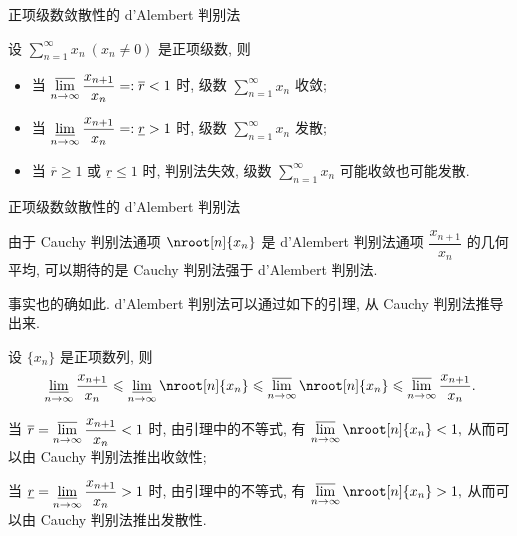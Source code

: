 \begin{frame}{正项级数敛散性的 d'Alembert 判别法}

\begin{thm}
设 $\sum\limits_{n=1}^\infty x_n ~ (x_n \neq 0)$ 是正项级数, 则
\begin{itemize}
\item[(1).] 当 $\varlimsup\limits_{n\to\infty} \dfrac{x_{n+1}}{x_n} =: \overline{r} < 1$ 时, 级数 $\sum\limits_{n=1}^\infty x_n$ 收敛;
\item[(2).] 当 $\varliminf\limits_{n\to\infty} \dfrac{x_{n+1}}{x_n} =: \underline{r} > 1$ 时, 级数 $\sum\limits_{n=1}^\infty x_n$ 发散;
\item[(3).] 当 $\overline{r} \geqslant 1$ 或 $\underline{r} \leqslant 1$ 时, 判别法失效, 级数 $\sum\limits_{n=1}^\infty x_n$ 可能收敛也可能发散.
\end{itemize}
\end{thm}

\end{frame}


\begin{frame}{正项级数敛散性的 d'Alembert 判别法}

由于 Cauchy 判别法通项 $\nroot[n]{x_n}$ 是 d'Alembert 判别法通项 $\dfrac{x_{n+1}}{x_n}$ 的几何平均, 可以期待的是 Cauchy 判别法强于 d'Alembert 判别法.

\pause
\vspace*{0.4em}

事实也的确如此. d'Alembert 判别法可以通过如下的引理, 从 Cauchy 判别法推导出来.

\pause
\vspace*{0.4em}

\begin{lem}
设 $\{x_n\}$ 是正项数列, 则
\[
\varliminf\limits_{n\to\infty} \dfrac{x_{n+1}}{x_n} \leqslant \varliminf\limits_{n\to\infty} \nroot[n]{x_n} \leqslant \varlimsup\limits_{n\to\infty} \nroot[n]{x_n} \leqslant \varlimsup\limits_{n\to\infty} \dfrac{x_{n+1}}{x_n}.
\]
\end{lem}

\pause
\vspace*{0.6em}

当 $\overline{r} = \varlimsup\limits_{n\to\infty} \dfrac{x_{n+1}}{x_n} < 1$ 时, 由引理中的不等式, 有 $\varlimsup\limits_{n\to\infty} \nroot[n]{x_n} < 1,$ 从而可以由 Cauchy 判别法推出收敛性;

\pause
\vspace*{0.6em}
当 $\underline{r} = \varliminf\limits_{n\to\infty} \dfrac{x_{n+1}}{x_n} > 1$ 时, 由引理中的不等式, 有 $\varlimsup\limits_{n\to\infty} \nroot[n]{x_n} > 1,$ 从而可以由 Cauchy 判别法推出发散性.

\end{frame}

